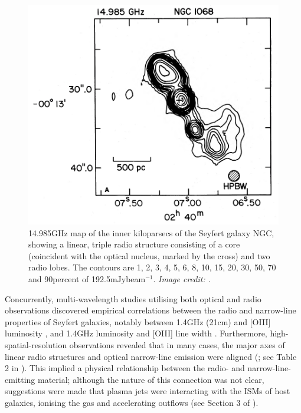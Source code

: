 \begin{figure}[!t]
    \centering
    \includegraphics[width=0.8\linewidth, trim={0 0 -3cm 0}, clip]{figures/introduction/ulvestad1982_ngc1068_15ghz.png}
    \caption[14.985\;GHz radio map of the inner kiloparsecs of the Seyfert galaxy NGC (as presented by \citealt{Wilson1982}), showing a linear radio structure.]{14.985\;GHz map of the inner kiloparsecs of the Seyfert galaxy NGC, showing a linear, triple radio structure consisting of a core (coincident with the optical nucleus, marked by the cross) and two radio lobes. The contours are 1, 2, 3, 4, 5, 6, 8, 10, 15, 20, 30, 50, 70 and 90\;per\;cent of 192.5\;mJy\;beam$^{-1}$. \textit{Image credit: \citet{Wilson1982}}.}
    \label{fig: introduction: historical_context: nlr_studies: wilson1982_ngc1068_15ghz}
\end{figure}

Concurrently, multi-wavelength studies utilising both optical and radio observations discovered empirical correlations between the radio and narrow-line properties of Seyfert galaxies, notably between 1.4\;GHz (21\;cm) and [OIII] luminosity \citep{deBruyn1978}, and 1.4\;GHz luminosity and [OIII] line width \citep{Wilson1980}. Furthermore, high-spatial-resolution observations revealed that in many cases, the major axes of linear radio structures and optical narrow-line emission were aligned (\citealt{Ulvestad1981}; see Table 2 in \citealt{Wilson1985}). This implied a physical relationship between the radio- and narrow-line-emitting material; although the nature of this connection was not clear, suggestions were made that plasma jets were interacting with the ISMs of host galaxies, ionising the gas and accelerating outflows (see Section 3 of \citealt{Wilson1985}).

